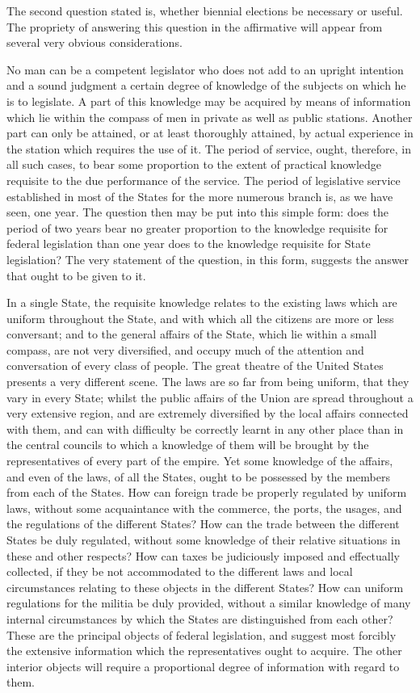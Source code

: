 The second question stated is, whether biennial elections be necessary or useful. 
The propriety of answering this question in the affirmative will appear from several very obvious considerations.

No man can be a competent legislator who does not add to an upright intention and a sound judgment a certain degree of knowledge of the subjects on which he is to legislate. 
A part of this knowledge may be acquired by means of information which lie within the compass of men in private as well as public stations. 
Another part can only be attained, or at least thoroughly attained, by actual experience in the station which requires the use of it. 
The period of service, ought, therefore, in all such cases, to bear some proportion to the extent of practical knowledge requisite to the due performance of the service. 
The period of legislative service established in most of the States for the more numerous branch is, as we have seen, one year. 
The question then may be put into this simple form: does the period of two years bear no greater proportion to the knowledge requisite for federal legislation than one year does to the knowledge requisite for State legislation? 
The very statement of the question, in this form, suggests the answer that ought to be given to it.

In a single State, the requisite knowledge relates to the existing laws which are uniform throughout the State, and with which all the citizens are more or less conversant; and to the general affairs of the State, which lie within a small compass, are not very diversified, and occupy much of the attention and conversation of every class of people. 
The great theatre of the United States presents a very different scene. 
The laws are so far from being uniform, that they vary in every State; whilst the public affairs of the Union are spread throughout a very extensive region, and are extremely diversified by the local affairs connected with them, and can with difficulty be correctly learnt in any other place than in the central councils to which a knowledge of them will be brought by the representatives of every part of the empire. 
Yet some knowledge of the affairs, and even of the laws, of all the States, ought to be possessed by the members from each of the States. 
How can foreign trade be properly regulated by uniform laws, without some acquaintance with the commerce, the ports, the usages, and the regulations of the different States? 
How can the trade between the different States be duly regulated, without some knowledge of their relative situations in these and other respects? 
How can taxes be judiciously imposed and effectually collected, if they be not accommodated to the different laws and local circumstances relating to these objects in the different States? 
How can uniform regulations for the militia be duly provided, without a similar knowledge of many internal circumstances by which the States are distinguished from each other? 
These are the principal objects of federal legislation, and suggest most forcibly the extensive information which the representatives ought to acquire. 
The other interior objects will require a proportional degree of information with regard to them.

